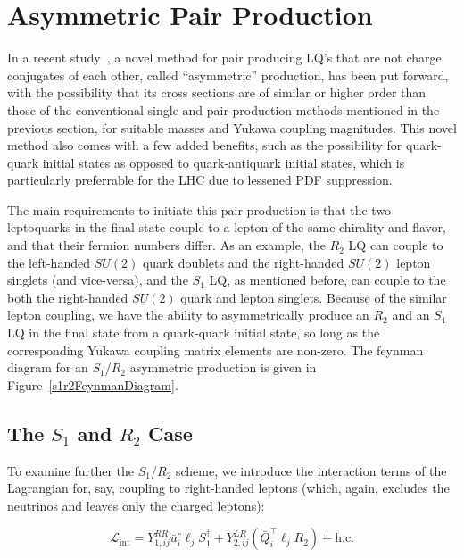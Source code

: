 \section{Asymmetric Pair Production}
    In a recent study~\cite{Dorsner_2023}, a novel method for pair producing LQ's that are not charge conjugates of each other, called ``asymmetric'' production, has been put forward, with the possibility that its cross sections are of similar or higher order than those of the conventional single and pair production methods mentioned in the previous section, for suitable masses and Yukawa coupling magnitudes. This novel method also comes with a few added benefits, such as the possibility for quark-quark initial states as opposed to quark-antiquark initial states, which is particularly preferrable for the LHC due to lessened PDF suppression.

    The main requirements to initiate this pair production is that the two leptoquarks in the final state couple to a lepton of the same chirality and flavor, and that their fermion numbers differ. As an example, the $R_2$ LQ can couple to the left-handed $SU(2)$ quark doublets and the right-handed $SU(2)$ lepton singlets (and vice-versa), and the $S_1$ LQ, as mentioned before, can couple to the both the right-handed $SU(2)$ quark and lepton singlets. Because of the similar lepton coupling, we have the ability to asymmetrically produce an $R_2$ and an $S_1$ LQ in the final state from a quark-quark initial state, so long as the corresponding Yukawa coupling matrix elements are non-zero. The feynman diagram for an $S_1$/$R_2$ asymmetric production is given in Figure~\ref{s1r2FeynmanDiagram}.

    

    \subsection{The \texorpdfstring{$S_1$ and $R_2$}{S1 and R2} Case}

        To examine further the $S_1$/$R_2$ scheme, we introduce the interaction terms of the Lagrangian for, say, coupling to right-handed leptons (which, again, excludes the neutrinos and leaves only the charged leptons):

        \begin{equation}
            \mathcal{L}_{\text{int}} = Y_{1,ij}^{RR} \bar{u}_i^c \ell_j S_1^{\dagger} + Y_{2,ij}^{LR} \left(\bar{Q}_i^{\intercal} \ell_j R_2\right) + \text{h.c.}
        \end{equation}

